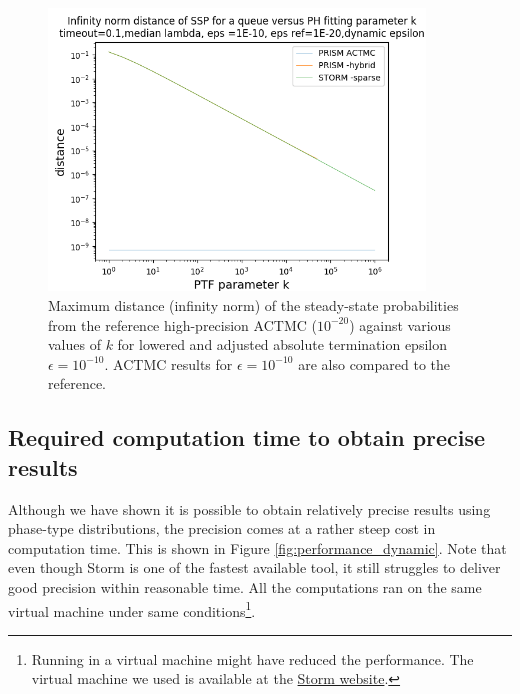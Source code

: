 \documentclass[runningheads,custombib]{llncs}
\begin{document}
	\begin{figure}[H]
		\begin{center}
			\includegraphics[trim=0.2cm 0cm 0cm 1.35cm,width=10cm, clip]{../picture/New_model/1E-10/distance_dynamic_1E-10.png}
		\end{center}
		\caption{Maximum distance (infinity norm) of the steady-state probabilities from the reference high-precision ACTMC ($10^{-20}$) against various values of $k$ for lowered and adjusted absolute termination epsilon $\epsilon = 10^{-10}$. ACTMC results for $\epsilon = 10^{-10}$ are also compared to the reference.}
		\label{fig:distance_dynamic_1E-10_constant_kappa}
	\end{figure}
	
	\subsection{Required computation time to obtain precise results}
	\label{computation_time}
	
	Although we have shown it is possible to obtain relatively precise results using phase-type distributions, the precision comes at a rather steep cost in computation time. This is shown in Figure \ref{fig:performance_dynamic}. Note that even though Storm is one of the fastest available tool, it still struggles to deliver good precision within reasonable time. All the computations ran on the same virtual machine under same conditions\footnote{Running in a virtual machine might have reduced the performance. The virtual machine we used is available at the \href{http://www.stormchecker.org/documentation/vm/vm.html}{Storm website}.}.
	
\end{document}
